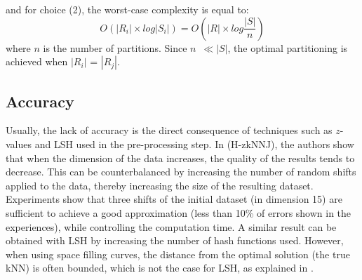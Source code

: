and for choice (2), the worst-case complexity is equal to:
\begin{equation}
O\left(\left|R_i\right| \times log\left|S_i\right|\right) = O\left(\left|R\right|\times log\frac{\left|S\right|}{n}\right) \label{eq:complexity2}
\end{equation}
where $n$ is the number of partitions. Since $n$~$\ll \left|S\right|$, the 
optimal partitioning is achieved when $\left| R_i \right|$ = $\left| R_j \right|$.


\subsection{Accuracy}

Usually, the lack of accuracy is the direct consequence of techniques such as  $z$-values and LSH used in the pre-processing step. In 
\cite{Zhang:2012:EPK:2247596.2247602} (H-zkNNJ), the authors show that when the dimension of the data increases, the quality of 
the results tends to decrease. This can be counterbalanced by increasing the number of random shifts applied to the data, thereby 
increasing the size of the resulting dataset. Experiments show that three 
shifts of the initial dataset (in dimension 15) are sufficient to achieve a good approximation 
(less than 10\% of errors shown in the experiences), while controlling the computation time. A similar result can be obtained with LSH by 
increasing the number of hash functions used. However, when using space filling curves, the distance from the optimal solution (the true kNN) is often bounded, which is not the case for LSH, as explained in \cite{liao2001high}.

